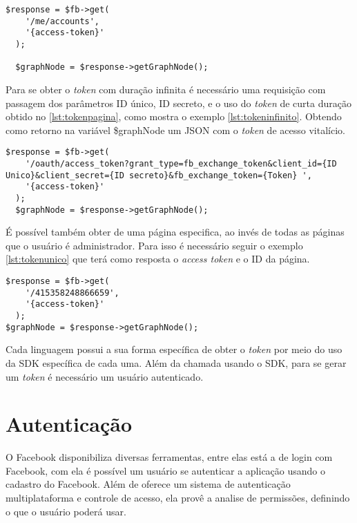 \begin{lstlisting}[caption={Obtendo Token de acesso a página},label={lst:tokenpagina}]
  $response = $fb->get(
    '/me/accounts',
    '{access-token}'
  );
  
  $graphNode = $response->getGraphNode();
\end{lstlisting}

Para se obter o \textit{token} com duração infinita é necessário uma requisição com passagem dos parâmetros ID único, ID secreto, e o uso do \textit{token} de curta duração obtido no \ref{lst:tokenpagina}, como mostra o exemplo \ref{lst:tokeninfinito}. Obtendo como retorno na variável \$graphNode um JSON com o \textit{token} de acesso vitalício.

\begin{lstlisting}[caption={Obtendo Token Infinito},label={lst:tokeninfinito}]
  $response = $fb->get(
    '/oauth/access_token?grant_type=fb_exchange_token&client_id={ID Unico}&client_secret={ID secreto}&fb_exchange_token={Token} ',
    '{access-token}'
  );
  $graphNode = $response->getGraphNode();
\end{lstlisting}

É possível também obter de uma página especifica, ao invés de todas as páginas que o usuário é administrador. Para isso é necessário seguir o exemplo \ref{lst:tokenunico} que terá como resposta o \textit{access token} e o ID da página.

\begin{lstlisting}[caption={Obtendo Token de uma única página},label={lst:tokenunico}]
  $response = $fb->get(
    '/415358248866659',
    '{access-token}'
  );
$graphNode = $response->getGraphNode();
\end{lstlisting}

Cada linguagem possui a sua forma específica de obter o \textit{token} por meio do uso da SDK específica de cada uma. Além da chamada usando o SDK, para se gerar um \textit{token} é necessário um usuário autenticado.

\section{Autenticação}
O Facebook disponibiliza diversas ferramentas, entre elas está a de login com Facebook, com ela é possível um usuário se autenticar a aplicação usando o cadastro do Facebook. Além de oferece um sistema de autenticação multiplataforma e controle de acesso, ela provê a analise de permissões, definindo o que o usuário poderá usar. \cite{facebook2018c}


